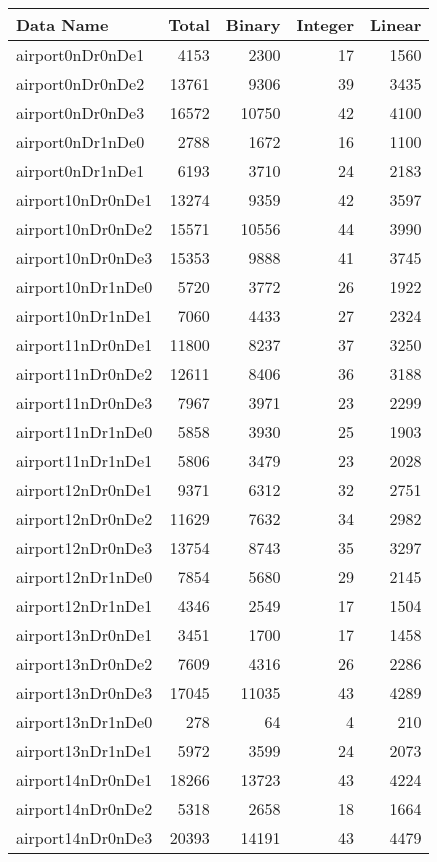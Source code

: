 \begin{tabular}{lrrrr}
\toprule
Data Name & Total & Binary & Integer & Linear \\
\midrule
airport0nDr0nDe1 & 4153 & 2300 & 17 & 1560 \\
airport0nDr0nDe2 & 13761 & 9306 & 39 & 3435 \\
airport0nDr0nDe3 & 16572 & 10750 & 42 & 4100 \\
airport0nDr1nDe0 & 2788 & 1672 & 16 & 1100 \\
airport0nDr1nDe1 & 6193 & 3710 & 24 & 2183 \\
airport10nDr0nDe1 & 13274 & 9359 & 42 & 3597 \\
airport10nDr0nDe2 & 15571 & 10556 & 44 & 3990 \\
airport10nDr0nDe3 & 15353 & 9888 & 41 & 3745 \\
airport10nDr1nDe0 & 5720 & 3772 & 26 & 1922 \\
airport10nDr1nDe1 & 7060 & 4433 & 27 & 2324 \\
airport11nDr0nDe1 & 11800 & 8237 & 37 & 3250 \\
airport11nDr0nDe2 & 12611 & 8406 & 36 & 3188 \\
airport11nDr0nDe3 & 7967 & 3971 & 23 & 2299 \\
airport11nDr1nDe0 & 5858 & 3930 & 25 & 1903 \\
airport11nDr1nDe1 & 5806 & 3479 & 23 & 2028 \\
airport12nDr0nDe1 & 9371 & 6312 & 32 & 2751 \\
airport12nDr0nDe2 & 11629 & 7632 & 34 & 2982 \\
airport12nDr0nDe3 & 13754 & 8743 & 35 & 3297 \\
airport12nDr1nDe0 & 7854 & 5680 & 29 & 2145 \\
airport12nDr1nDe1 & 4346 & 2549 & 17 & 1504 \\
airport13nDr0nDe1 & 3451 & 1700 & 17 & 1458 \\
airport13nDr0nDe2 & 7609 & 4316 & 26 & 2286 \\
airport13nDr0nDe3 & 17045 & 11035 & 43 & 4289 \\
airport13nDr1nDe0 & 278 & 64 & 4 & 210 \\
airport13nDr1nDe1 & 5972 & 3599 & 24 & 2073 \\
airport14nDr0nDe1 & 18266 & 13723 & 43 & 4224 \\
airport14nDr0nDe2 & 5318 & 2658 & 18 & 1664 \\
airport14nDr0nDe3 & 20393 & 14191 & 43 & 4479 \\

\end{tabular}

